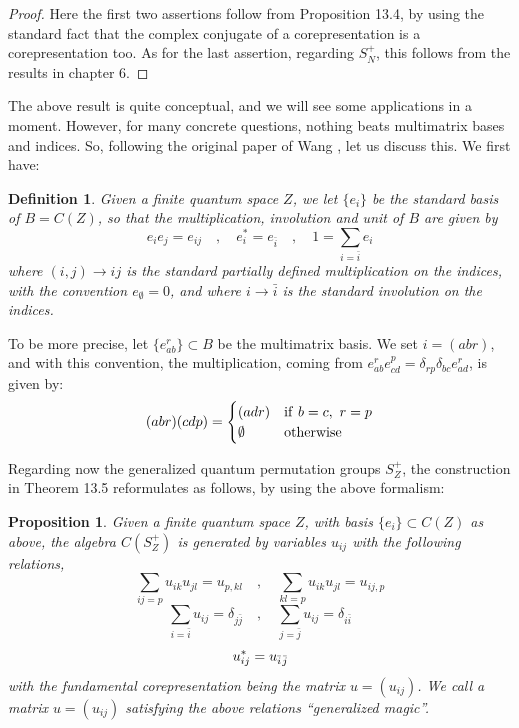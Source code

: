 \documentclass[12pt]{amsbook}
\newtheorem{definition}[theorem]{Definition}
\newtheorem{proposition}[theorem]{Proposition}
\begin{document}
\begin{proof}
Here the first two assertions follow from Proposition 13.4, by using the standard fact that the complex conjugate of a corepresentation is a corepresentation too. As for the last assertion, regarding $S_N^+$, this follows from the results in chapter 6.
\end{proof}

The above result is quite conceptual, and we will see some applications in a moment. However, for many concrete questions, nothing beats multimatrix bases and indices. So, following the original paper of Wang \cite{wan}, let us discuss this. We first have:

\begin{definition}
Given a finite quantum space $Z$, we let $\{e_i\}$ be the standard basis of $B=C(Z)$, so that the multiplication, involution and unit of $B$ are given by
$$e_ie_j=e_{ij}\quad,\quad 
e_i^*=e_{\bar{i}}\quad,\quad
1=\sum_{i=\bar{i}}e_i$$
where $(i,j)\to ij$ is the standard partially defined multiplication on the indices, with the convention $e_\emptyset=0$, and where $i\to\bar{i}$ is the standard involution on the indices.
\end{definition}

To be more precise, let $\{e_{ab}^r\}\subset B$ be the multimatrix basis. We set $i=(abr)$, and with this convention, the multiplication, coming from $e_{ab}^re_{cd}^p=\delta_{rp}\delta_{bc}e_{ad}^r$, is given by:
$$(abr)(cdp)=\begin{cases}
(adr)&{\rm if}\ b=c,\ r=p\\
\emptyset&{\rm otherwise}
\end{cases}$$

Regarding now the generalized quantum permutation groups $S_Z^+$, the construction in Theorem 13.5 reformulates as follows, by using the above formalism:

\begin{proposition}
Given a finite quantum space $Z$, with basis $\{e_i\}\subset C(Z)$ as above, the algebra $C(S_Z^+)$ is generated by variables $u_{ij}$ with the following relations,
$$\sum_{ij=p}u_{ik}u_{jl}=u_{p,kl}\quad,\quad\sum_{kl=p}u_{ik}u_{jl}=u_{ij,p}$$
$$\sum_{i=\bar{i}}u_{ij}=\delta_{j\bar{j}}\quad,\quad\sum_{j=\bar{j}}u_{ij}=\delta_{i\bar{i}}$$
$$u_{ij}^*=u_{\bar{i}\hskip0.3mm\bar{j}}$$
with the fundamental corepresentation being the matrix $u=(u_{ij})$. We call a matrix $u=(u_{ij})$ satisfying the above relations ``generalized magic''.
\end{proposition}
\end{document}
